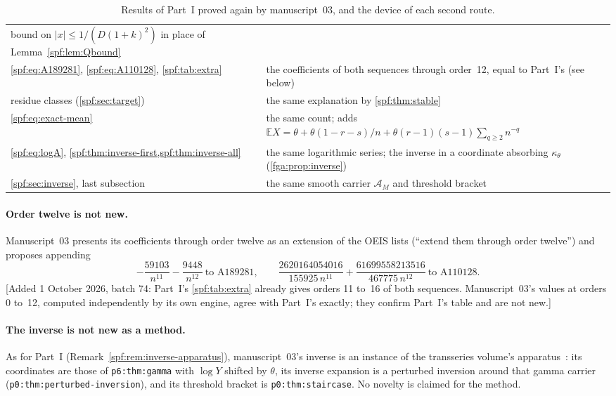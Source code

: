 \documentclass[11pt]{article}
\numberwithin{equation}{section}
\theoremstyle{definition}
\theoremstyle{remark}
\theoremstyle{definition}
\newcommand{\E}{\mathbb E}
\begin{document}
\begin{table}[htbp]
\begin{tabular}{@{}>{\raggedright\arraybackslash}p{}>{\raggedright\arraybackslash}p{}@{}}
bound on $|x|\le1/(D(1+k)^2)$ in place of Lemma~\ref{spf:lem:Qbound}\\
\eqref{spf:eq:A189281}, \eqref{spf:eq:A110128}, \cref{spf:tab:extra} &
the coefficients of both sequences through order~12, equal to Part~I's
(see below)\\
residue classes (\cref{spf:sec:target}) &
the same explanation by \cref{spf:thm:stable}\\
\eqref{spf:eq:exact-mean} &
the same count; adds
$\E X=\theta+\theta(1-r-s)/n+\theta(r-1)(s-1)\sum_{q\ge2}n^{-q}$\\
\eqref{spf:eq:logA}, \cref{spf:thm:inverse-first,spf:thm:inverse-all} &
the same logarithmic series; the inverse in a coordinate absorbing
$\kappa_\theta$ (\cref{fga:prop:inverse})\\
\cref{spf:sec:inverse}, last subsection &
the same smooth carrier $\mathcal A_M$ and threshold bracket\\
\bottomrule
\end{tabular}
\caption{Results of Part~I proved again by manuscript~03, and the device of
each second route.}
\label{fga:tab:routes}
\end{table}

\paragraph{Order twelve is not new.} Manuscript~03 presents its
coefficients through order twelve as an extension of the OEIS lists
(``extend them through order twelve'') and proposes appending
\[
 -\frac{59103}{n^{11}}-\frac{9448}{n^{12}}\ \text{to A189281},\qquad
 \frac{2620164054016}{155925\,n^{11}}+\frac{61699558213516}{467775\,n^{12}}
 \ \text{to A110128}.
\]
[Added 1 October 2026, batch 74: Part~I's \cref{spf:tab:extra} already
gives orders 11 to~16 of both sequences. Manuscript~03's values at orders
0 to~12, computed independently by its own engine, agree with Part~I's
exactly; they confirm Part~I's table and are not new.]

\paragraph{The inverse is not new as a method.} As for Part~I
(Remark~\ref{spf:rem:inverse-apparatus}), manuscript~03's inverse is an instance
of the transseries volume's apparatus~\cite{tai}: its coordinates are those
of \texttt{p6:thm:gamma} with $\log Y$ shifted by $\theta$, its inverse
expansion is a perturbed inversion around that gamma carrier
(\texttt{p0:thm:perturbed-inversion}), and its threshold bracket is
\texttt{p0:thm:staircase}. No novelty is claimed for the method.
\end{document}
